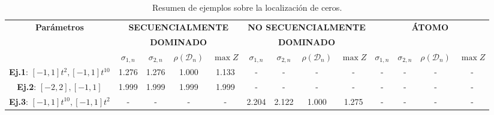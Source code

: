 \begin{table}
  \centering
  \footnotesize
  \caption{Resumen de ejemplos sobre la localización de ceros.}
  \begin{tabular}{|c|cccc|cccc|cccc|}
    \hline
    \multirow{3}{*}{\textbf{Parámetros}}       & \multicolumn{4}{c|}{\textbf{SECUENCIALMENTE}} & \multicolumn{4}{c|}{\textbf{NO SECUENCIALMENTE}} & \multicolumn{4}{c|}{\textbf{ÁTOMO}}                                                                                                                                                                      \\
                                               & \multicolumn{4}{c|}{\textbf{DOMINADO}}        & \multicolumn{4}{c|}{\textbf{DOMINADO}}           & \multicolumn{4}{c|}{}                                                                                                                                                                                    \\
    \cline{2-13}
                                               & $\sigma_{1,n}$                                & $\sigma_{2,n}$                                   & $\rho(\mathcal{D}_{n})$             & $\max Z$ & $\sigma_{1,n}$       & $\sigma_{2,n}$ & $\rho(\mathcal{D}_{n})$ & $\max Z$ & $\sigma_{1,n}$       & $\sigma_{2,n}$ & $\rho(\mathcal{D}_{n})$ & $\max Z$ \\
    \hline
    \textbf{Ej.1}: $[-1,1]t^2, [-1,1]t^{10}$   & 1.276                                         & 1.276                                            & 1.000                               & 1.133    & -                    & -              & -                       & -        & -                    & -              & -                       & -        \\
    \textbf{Ej.2}: $[-2,2], [-1,1]$            & 1.999                                         & 1.999                                            & 1.999                               & 1.999    & -                    & -              & -                       & -        & -                    & -              & -                       & -        \\
    \textbf{Ej.3}: $[-1,1]t^{10}, [-1,1]t^{2}$ & -                                             & -                                                & -                                   & -        & 2.204                & 2.122          & 1.000                   & 1.275    & -                    & -              & -                       & -        \\

\end{tabular}
\end{table}
